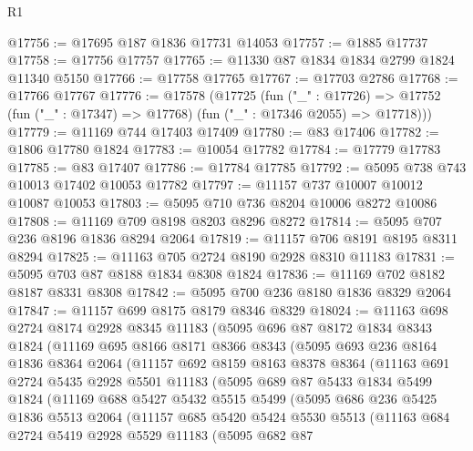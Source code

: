 \begin{lexlean}{R1}
\begin{coremodule}
@17756 := @17695 @187 @1836 @17731 @14053
@17757 := @1885 @17737
@17758 := @17756 @17757
@17765 := @11330 @87 @1834 @1834 @2799 @1824 @11340 @5150
@17766 := @17758 @17765
@17767 := @17703 @2786
@17768 := @17766 @17767
@17776 := @17578
    (@17725
      (fun ("_" : @17726) =>
      @17752 (fun ("_" : @17347) => @17768) (fun ("_" : @17346 @2055) => @17718)))
@17779 := @11169 @744 @17403 @17409
@17780 := @83 @17406
@17782 := @1806 @17780 @1824
@17783 := @10054 @17782
@17784 := @17779 @17783
@17785 := @83 @17407
@17786 := @17784 @17785
@17792 := @5095 @738 @743 @10013 @17402 @10053 @17782
@17797 := @11157 @737 @10007 @10012 @10087 @10053
@17803 := @5095 @710 @736 @8204 @10006 @8272 @10086
@17808 := @11169 @709 @8198 @8203 @8296 @8272
@17814 := @5095 @707 @236 @8196 @1836 @8294 @2064
@17819 := @11157 @706 @8191 @8195 @8311 @8294
@17825 := @11163 @705 @2724 @8190 @2928 @8310 @11183
@17831 := @5095 @703 @87 @8188 @1834 @8308 @1824
@17836 := @11169 @702 @8182 @8187 @8331 @8308
@17842 := @5095 @700 @236 @8180 @1836 @8329 @2064
@17847 := @11157 @699 @8175 @8179 @8346 @8329
@18024 := @11163
    @698
    @2724
    @8174
    @2928
    @8345
    @11183
    (@5095
      @696
      @87
      @8172
      @1834
      @8343
      @1824
      (@11169
        @695
        @8166
        @8171
        @8366
        @8343
        (@5095
          @693
          @236
          @8164
          @1836
          @8364
          @2064
          (@11157
            @692
            @8159
            @8163
            @8378
            @8364
            (@11163
              @691
              @2724
              @5435
              @2928
              @5501
              @11183
              (@5095
                @689
                @87
                @5433
                @1834
                @5499
                @1824
                (@11169
                  @688
                  @5427
                  @5432
                  @5515
                  @5499
                  (@5095
                    @686
                    @236
                    @5425
                    @1836
                    @5513
                    @2064
                    (@11157
                      @685
                      @5420
                      @5424
                      @5530
                      @5513
                      (@11163
                        @684
                        @2724
                        @5419
                        @2928
                        @5529
                        @11183
                        (@5095
                          @682
                          @87

\end{coremodule}
\end{lexlean}
